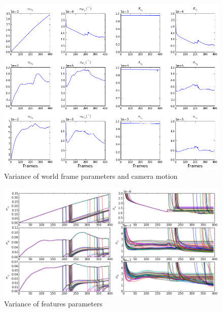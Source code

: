 
\begin{figure}[h]
\centering
\includegraphics[width=14cm, keepaspectratio=true]
{./Figures/fltfig/cut1/Figure120.png}
\caption{Variance of world frame parameters and camera motion}
\label{fltfig:120}
\end{figure}


\begin{figure}[h]
\centering
\includegraphics[width=14cm, keepaspectratio=true]
{./Figures/fltfig/cut1/Figure40.png}
\caption{Variance of features parameters}
\label{fltfig:3}
\end{figure}
\FloatBarrier

